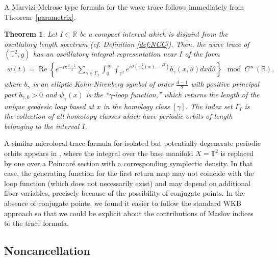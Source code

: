 \documentclass[11pt,letterpaper,oneside]{amsart}
\newcommand{\R}{\mathbb{R}}
\newcommand{\T}{\mathbb{T}}
\renewcommand{\theta}{\vartheta}
\newtheorem{theo}{Theorem}[section]
\theoremstyle{definition}
\theoremstyle{remark}
\renewcommand{\Re}{\operatorname{Re}}
\theoremstyle{definition}
\theoremstyle{remark}
\begin{document}
A Marvizi-Melrose type formula for the wave trace follows immediately from Theorem~\ref{parametrix}.
\begin{theo}\label{MM style parametrix}
    Let $I \subset \R$ be a compact interval which is disjoint from the oscillatory length spectrum (cf. Definition \ref{def:NCC}). Then, the wave trace of $(\T^2, g)$ has an oscillatory integral representation near $I$ of the form
    \begin{align*}
        w(t) = \Re \left \{ e^{- i \pi \frac{d - 1}{4}} \sum_{\gamma \in \Gamma_I} \int_0^\infty \int_{\T^2} e^{i \theta (\psi_{\gamma}^2(x) - t^2)} b_\gamma(x, \theta) dx d\theta \right\} \mod C^\infty(\R),
    \end{align*}
    where $b_\gamma$ is an elliptic Kohn-Nirenberg symbol of order $\frac{d-1}{2}$ with positive principal part $b_{\gamma, 0} > 0$ and $\psi_\gamma(x)$ is the ``$\gamma$-loop function,'' which returns the length of the unique geodesic loop based at $x$ in the homology class $[\gamma]$. The index set $\Gamma_I$ is the collection of all homotopy classes which have periodic orbits of length belonging to the interval $I$.
\end{theo}
A similar microlocal trace formula for isolated but potentially degenerate periodic orbits appears in \cite{PopovDegenerate}, where the integral over the base manifold $X = \T^2$ is replaced by one over a Poincar\'e section with a corresponding symplectic density. In that case, the generating function for the first return map may not coincide with the loop function (which does not necessarily exist) and may depend on additional fiber variables, precisely because of the possibility of conjugate points. In the absence of conjugate points, we found it easier to follow the standard WKB approach so that we could be explicit about the contributions of Maslov indices to the trace formula.
		
\subsection{Noncancellation}
\end{document}
